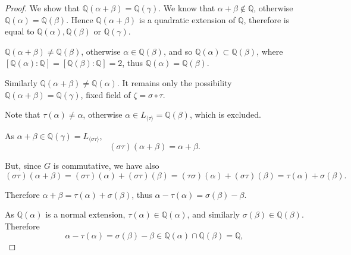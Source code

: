 \documentclass[11pt,a4paper]{article}
\newcommand{\Q}{\mathbb{Q}}
\begin{document}
\begin{proof}
\bigskip


\bigskip

We show that $\Q(\alpha+\beta) = \Q(\gamma)$. We know that $\alpha + \beta \not \in \Q$, otherwise $\Q(\alpha) = \Q(\beta)$. Hence $\Q(\alpha+\beta)$ is a quadratic extension of $\Q$, therefore  is equal to $\Q(\alpha), \Q(\beta)$ or $\Q(\gamma)$.

$\Q(\alpha+\beta) \ne \Q(\beta)$, otherwise $\alpha \in \Q(\beta)$, and so $\Q(\alpha) \subset \Q(\beta)$, where $[\Q(\alpha) : \Q] = [\Q(\beta):\Q] = 2$, thus $\Q(\alpha) = \Q(\beta)$.

Similarly $\Q(\alpha+\beta) \ne \Q(\alpha)$.
It remains only the possibility $\Q(\alpha+ \beta) = \Q(\gamma)$, fixed field of $\zeta = \sigma \circ \tau$.

Note that $\tau(\alpha) \neq \alpha$, otherwise $\alpha \in L_{\langle \tau \rangle} = \Q(\beta)$, which is excluded. 

As $\alpha + \beta \in \Q(\gamma) = L_{\langle \sigma \tau \rangle}$, $$(\sigma \tau)(\alpha + \beta) = \alpha + \beta.$$

But, since $G$ is commutative, we have also $$(\sigma \tau)(\alpha + \beta) = (\sigma \tau)(\alpha) + (\sigma \tau)(\beta )=( \tau \sigma)(\alpha) + (\sigma \tau)(\beta ) = \tau(\alpha)+ \sigma(\beta).$$

Therefore $\alpha+ \beta = \tau(\alpha) + \sigma(\beta)$, thus $\alpha - \tau(\alpha) = \sigma(\beta) - \beta$.

As $\Q(\alpha)$ is a normal extension, $\tau(\alpha) \in \Q(\alpha)$, and similarly $\sigma(\beta) \in \Q(\beta)$. Therefore
$$\alpha - \tau(\alpha) = \sigma(\beta) - \beta \in \Q(\alpha) \cap \Q(\beta) = \Q, $$


\end{proof}
\end{document}
